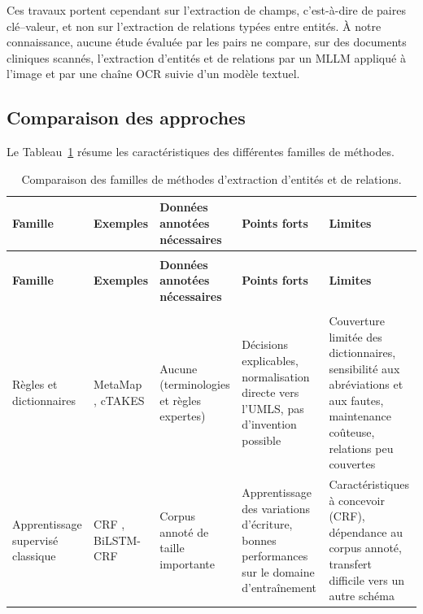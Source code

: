 Ces travaux portent cependant sur l'extraction de champs, c'est-à-dire de paires clé--valeur, et non sur l'extraction de relations typées entre entités. À notre connaissance, aucune étude évaluée par les pairs ne compare, sur des documents cliniques scannés, l'extraction d'entités et de relations par un MLLM appliqué à l'image et par une chaîne OCR suivie d'un modèle textuel.

\subsection{Comparaison des approches}

Le Tableau~\ref{tab:comparaison_er} résume les caractéristiques des différentes familles de méthodes.

{\footnotesize
\renewcommand{\arraystretch}{1.35}
\begin{longtable}{|>{\raggedright\arraybackslash}p{2.1cm}|>{\raggedright\arraybackslash}p{2.4cm}|>{\raggedright\arraybackslash}p{2.2cm}|>{\raggedright\arraybackslash}p{3.0cm}|>{\raggedright\arraybackslash}p{3.4cm}|}
\caption{Comparaison des familles de méthodes d'extraction d'entités et de relations.}
\label{tab:comparaison_er}\\
\hline
\textbf{Famille} & \textbf{Exemples} & \textbf{Données annotées nécessaires} & \textbf{Points forts} & \textbf{Limites} \\
\hline
\endfirsthead
\multicolumn{5}{l}{\textit{Tableau~\ref{tab:comparaison_er} (suite)}}\\
\hline
\textbf{Famille} & \textbf{Exemples} & \textbf{Données annotées nécessaires} & \textbf{Points forts} & \textbf{Limites} \\
\hline
\endhead
\hline
\multicolumn{5}{r}{\textit{Suite à la page suivante}}\\
\endfoot
\hline
\endlastfoot

Règles et dictionnaires &
MetaMap \cite{aronson2010metamap}, cTAKES \cite{savova2010ctakes} &
Aucune (terminologies et règles expertes) &
Décisions explicables, normalisation directe vers l'UMLS, pas d'invention possible &
Couverture limitée des dictionnaires, sensibilité aux abréviations et aux fautes, maintenance coûteuse, relations peu couvertes \\
\hline

Apprentissage supervisé classique &
CRF \cite{lafferty2001crf}, BiLSTM-CRF \cite{lample2016neural} &
Corpus annoté de taille importante &
Apprentissage des variations d'écriture, bonnes performances sur le domaine d'entraînement &
Caractéristiques à concevoir (CRF), dépendance au corpus annoté, transfert difficile vers un autre schéma \\
\hline


\end{longtable}}
